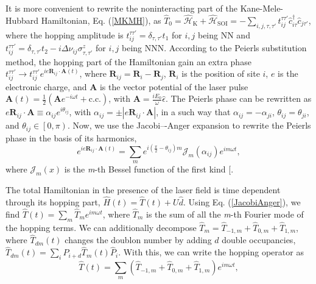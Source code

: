 \documentclass[aps,prl,twocolumn,amsmath,amssymb,nobibnotes]{revtex4-1}%
\renewcommand{\cite}[1]{{[}\onlinecite{#1}{]}}
\newcommand{\bs}{\boldsymbol}
\begin{document}
It is more convenient to rewrite the noninteracting part of the Kane-Mele-Hubbard Hamiltonian, Eq. (\ref{MKMH}), as $\hat{T}_0=\hat{\mathcal{H}}_{\text{K}}+\hat{\mathcal{H}}_{\text{SOI}} = - \sum_{i,j , \tau, \tau'}
t_{ij}^{\tau\tau'} \hat{c}_{i \tau}^\dagger \hat{c}_{j \tau'}$, where the hopping amplitude is $t_{ij}^{\tau\tau'} = \delta_{\tau,\tau'}t_1$ for $i,j$ being NN and $t_{ij}^{\tau\tau'} = \delta_{\tau,\tau'}t_2 - i\Delta\nu_{ij}\sigma^z_{\tau, \tau'}$ for $i,j$ being NNN.
According to the Peierls substitution method, the hopping part of the Hamiltonian gain an extra phase $t_{ij}^{\tau\tau'}\rightarrow t_{ij}^{\tau\tau'} e^{{i e \bs{R}_{ij} \cdot \bs{A}(t)}}$, where $\bs{R}_{ij} = \bs{R}_i-\bs{R}_j$, $\bs{R}_i$ is the position of site $i$, $e$ is the electronic charge, and $\bs{A}$ is the vector potential of the laser pulse $\bs{A}(t) = \frac{1}{2}(\bs{A} e^{-i\omega t} + \mathrm{c.c.})$, with $\bs{A} = \frac{iE_0}{\omega}\hat{\epsilon}$.
The Peierls phase can be rewritten as $e\bs{R}_{ij}\cdot\bs{A} \equiv \alpha_{ij} e^{i \theta_{ij}}$, with $\alpha_{ij} = \pm|e\bs{R}_{ij}\cdot \bs{A}|$, in a such way that $\alpha_{ij}= -\alpha_{ji}$, $\theta_{ij}= \theta_{ji}$, and $\theta_{ij} \in \left[0,\pi\right)$.
Now, we use the Jacobi–-Anger expansion to rewrite the Peierls phase in the basis of its harmonics,
\begin{equation}
\label{JacobiAnger}
e^{ie\bs{R}_{ij}\cdot\bs{A}(t)} = \sum_m e^{i(\frac{\pi}{2}-\theta_{ij})m} \mathcal{J}_m(\alpha_{ij}) e^{im\omega t},
\end{equation}
where $\mathcal{J}_m(x)$ is the \textit{m}-th Bessel function of the first kind \cite{Kitamura2017}.

The total Hamiltonian in the presence of the laser field is time dependent through its hopping part, $\hat{H}(t) = \hat{T}(t) +  U\hat{d}$. Using Eq. (\ref{JacobiAnger}), we find $\hat{T}(t) = \sum_m \hat{T}_m e^{im \omega t}$, where $\hat{T}_m$ is the sum of all the \textit{m}-th Fourier mode of the hopping terms. We can additionally decompose $\hat{T}_m = \hat{T}_{-1,m}+\hat{T}_{0,m}+\hat{T}_{1,m}$, where $\hat{T}_{dm}(t)$ changes the doublon number by adding $d$ double occupancies, $\hat{T}_{dm}(t) = \sum_i \hat{P}_{i+d}\hat{T}_{m}(t)\hat{P}_i$. With this, we can write the hopping operator as
\begin{equation}
\hat{T}(t) = \sum_m (\hat{T}_{-1,m}+\hat{T}_{0,m}+\hat{T}_{1,m})e^{im\omega t},
\end{equation}
\end{document}
